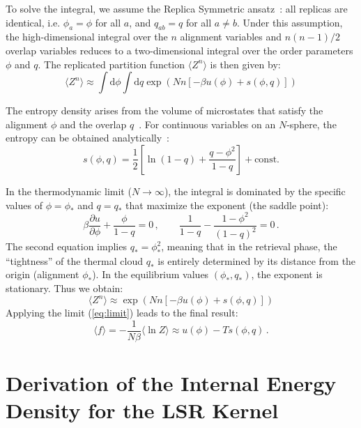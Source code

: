 \documentclass{article}
\newcommand{\dd}{{\mathrm{d}}}
\theoremstyle{plain}
\theoremstyle{definition}
\theoremstyle{remark}
\begin{document}
To solve the integral, we assume the Replica Symmetric ansatz~\cite{amit1987statistical}: all replicas are identical, i.e. $\phi_a = \phi$ for all $a$, and $q_{ab} = q$ for all $a \neq b$. Under this assumption, the high-dimensional integral over the $n$ alignment variables and $n(n-1)/2$ overlap variables reduces to a two-dimensional integral over the order parameters $\phi$ and $q$. The replicated partition function $\langle Z^n \rangle$ is then given by:
\begin{equation}
\langle Z^n \rangle \approx \int \dd \phi \int \dd q \exp \left( N n \left[ -\beta u(\phi) + s(\phi, q) \right] \right)
\end{equation}

The entropy density arises from the volume of microstates that satisfy the alignment $\phi$ and the overlap $q$~\cite{ea75}. For continuous variables on an $N$-sphere, the entropy can be obtained analytically~\citep[see][for details]{gardner1988space}:
\begin{equation}
    s(\phi, q) = \frac{1}{2} \left[ \ln(1-q) + \frac{q - \phi^2}{1-q} \right] + \text{const.}
\end{equation}

In the thermodynamic limit ($N \to \infty$), the integral is dominated by the specific values of $\phi=\phi_*$ and $q=q_*$ that maximize the exponent (the saddle point):
\begin{equation}
    \beta \frac{\partial u}{\partial \phi} + \frac{\phi}{1-q} = 0\,,\qquad 
    \frac{1}{1-q} - \frac{1-\phi^2}{(1-q)^2} = 0\,.
\end{equation}
The second equation implies $q_* = \phi_*^2$, meaning that in the retrieval phase, the ``tightness'' of the thermal cloud $q_*$ is entirely determined by its distance from the origin (alignment $\phi_*$). In the equilibrium values $(\phi_*, q_*)$, the exponent is stationary. Thus we obtain:
\begin{equation}
    \langle Z^n \rangle \approx \exp\left( N n [-\beta u(\phi) + s(\phi, q)] \right)
\end{equation}
Applying the limit (\ref{eq:limit}) leads to the final result:
\begin{equation}
    \langle f \rangle = -\frac{1}{N\beta} \langle \ln Z \rangle 
    \approx  u(\phi) - T s(\phi, q)\,.
\end{equation}

\section{Derivation of the Internal Energy Density for the LSR Kernel}
\end{document}
